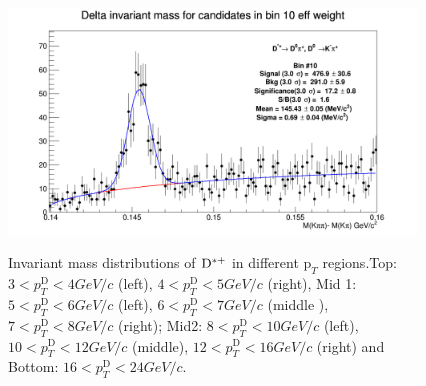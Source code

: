 \begin{enumerate}
\begin{figure}[!htp]
{\includegraphics[width=1\linewidth, height=6cm]{figures/Dstar_wEFF/InvMassDistributions_Dstar_Bins10to10.png}}

\caption{Invariant mass distributions of ${\rm D^{*+}}$ in different $\text{p}_T$ regions.Top: $3< p_{T}^{\text{D}}< 4 GeV/c$ (left), $4< p_{T}^{\text{D}}< 5 GeV/c$ (right), Mid 1: $5< p_{T}^{\text{D}}< 6 GeV/c$ (left), $6 < p_{T}^{\text{D}} < 7 GeV/c$ (middle ), $7< p_{T}^{\text{D}}< 8 GeV/c$ (right); Mid2: $8< p_{T}^{\text{D}}< 10GeV/c$ (left), $10< p_{T}^{\text{D}}< 12 GeV/c$ (middle), $12 < p_{T}^{\text{D}}< 16 GeV/c$ (right) and Bottom: $16<p_{T}^{\text{D}}< 24 GeV/c$.}
\label{fig:InvMass}
\end{figure}





\end{enumerate}
